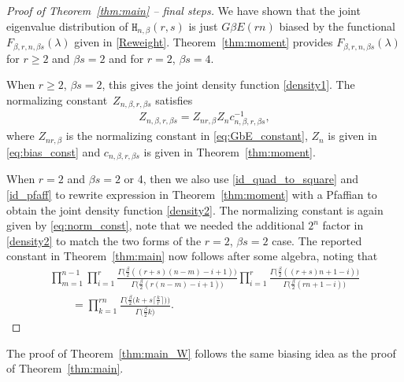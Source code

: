 \documentclass[pdftex]{sigma}
\numberwithin{equation}{section}
\theoremstyle{definition}
\newcommand{\HH}{\mathtt{H}_{n,\beta}}
\begin{document}
\begin{proof}[Proof of Theorem~\ref{thm:main} -- final steps]
We have shown that the joint eigenvalue distribution of $\HH(r,s)$ is just $G\beta{E}(rn)$ biased by the functional $
F_{\beta, r,n,\beta s}({\lambda})$ given in \eqref{Reweight}. Theorem~\ref{thm:moment} provides $
F_{\beta, r,n,\beta s}({\lambda})$ for $r\ge 2$ and $\beta s=2$ and for $r=2$, $\beta s=4$.

When $r\ge 2$, $\beta s=2$, this gives the joint density function \eqref{density1}. The normalizing constant~$Z_{n,\beta, r, \beta s}$ satisfies
\begin{align}\label{eq:norm_const}
 Z_{n,\beta,r,\beta s}=Z_{nr, \beta} Z_n c_{n,\beta, r, \beta s}^{-1},
\end{align}
where $Z_{nr,\beta}$ is the normalizing constant in \eqref{eq:GbE_constant}, $Z_n$ is given in \eqref{eq:bias_const} and $c_{n,\beta, r, \beta s}$ is given in Theorem~\ref{thm:moment}.

When $r=2$ and $\beta s=2$ or 4, then we also use \eqref{id_quad_to_square} and \eqref{id_pfaff} to rewrite expression in Theorem~\ref{thm:moment}
with a Pfaffian to obtain the joint density function \eqref{density2}. The normalizing constant is again given by \eqref{eq:norm_const}, note that we needed the additional $2^n$ factor in \eqref{density2} to match the two forms of the $r=2$, $\beta s=2$ case. The reported constant in Theorem~\ref{thm:main} now follows after some algebra, noting that
\begin{gather*}
 \prod_{m=1}^{n-1}\prod_{i=1}^r
\frac{ \Gamma \bigl(\frac{\beta}{2}((r+s)(n-m)-i+1 )\bigr)}{\Gamma \bigl(\frac{\beta}{2}(r(n-m)-i+1) \bigr)} \prod_{i=1}^{r}
\frac{ \Gamma \bigl(\frac{\beta}{2}((r+s)n+1-i) \bigr)}{\Gamma \bigl(\frac{\beta }{2}(rn+1-i)\bigr)}
\\
\qquad = \prod_{k=1}^{rn} \frac{\Gamma\bigl(\frac{\beta}{2} \bigl(k+s \lceil\frac{k}{r} \rceil\bigr)\bigr)}{\Gamma\bigl(\frac{\beta}{2} k\bigr)}.\tag*{\qed}
\end{gather*}\renewcommand{\qed}{}
 \end{proof}


The proof of Theorem~\ref{thm:main_W} follows the same biasing idea as the proof of Theorem~\ref{thm:main}.
\end{document}
